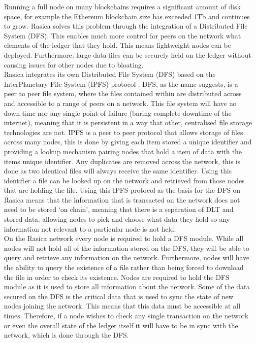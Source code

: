 Running a full node on many blockchains requires a significant amount of disk space, for example the Ethereum blockchain size has exceeded 1Tb \cite{EthBloat} and continues to grow. Rasica solves this problem through the integration of a Distributed File System (DFS). This enables much more control for peers on the network what elements of the ledger that they hold. This means lightweight nodes can be deployed. Furthermore, large data files can be securely held on the ledger without causing issues for other nodes due to bloating. \\

Rasica integrates its own Distributed File System (DFS) \cite{DFS} based on the InterPlanetary File System (IPFS) protocol \cite{benet2014ipfs}. DFS, as the name suggests, is a peer to peer file system, where the files contained within are distributed across and accessible to a range of peers on a network. This file system will have no down time nor any single point of failure (baring complete downtime of the internet), meaning that it is persistent in a way that other, centralised file storage technologies are not. IPFS is a peer to peer protocol that allows storage of files across many nodes, this is done by giving each item stored a unique identifier and providing a lookup mechanism pairing nodes that hold a item of data with the items unique identifier. Any duplicates are removed across the network, this is done as two identical files will always receive the same identifier. Using this identifier a file can be looked up on the network and retrieved from those nodes that are holding the file. Using this IPFS protocol as the basis for the DFS on Rasica means that the information that is transacted on the network does not need to be stored `on chain', meaning that there is a separation of DLT and stored data, allowing nodes to pick and choose what data they hold so any information not relevant to a particular node is not held. \\ %

On the Rasica network every node is required to hold a DFS module. While all nodes will not hold all of the information stored on the DFS, they will be able to query and retrieve any information on the network. Furthermore, nodes will have the ability to query the existence of a file rather than being forced to download the file in order to check its existence. Nodes are required to hold the DFS module as it is used to store all information about the network.  Some of the data secured on the DFS is the critical data that is used to sync the state of new nodes joining the network. This means that this data must be accessible at all times. Therefore, if a node wishes to check any single transaction on the network or even the overall state of the ledger itself it will have to be in sync with the network, which is done through the DFS.  \\ %

